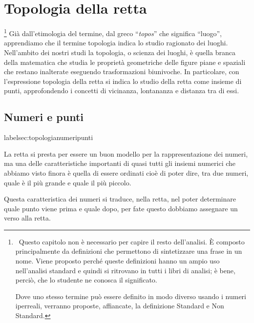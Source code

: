 


\chapter{Topologia della retta}

\footnote{~Questo capitolo non è necessario per capire il resto 
dell'analisi.
È composto principalmente da definizioni che permettono di sintetizzare una 
frase in un nome.
Viene proposto perché queste definizioni hanno un ampio uso nell'analisi 
standard e quindi si ritrovano in tutti i libri di analisi; 
è bene, perciò, che lo studente ne conosca il significato.

Dove uno stesso termine può essere definito in modo diverso 
usando i numeri iperreali, verranno proposte, affiancate, la definizione 
Standard e Non Standard.}
Già dall'etimologia del termine, dal greco ``\emph{topos}'' che significa 
``luogo'', apprendiamo che il termine topologia indica lo studio 
ragionato dei luoghi. 
Nell'ambito dei nostri studi la topologia, o scienza dei luoghi, 
è quella branca della matematica che studia le proprietà geometriche 
delle figure piane e spaziali che restano inalterate eseguendo 
trasformazioni biunivoche. 
In particolare, con l'espressione topologia della retta si indica 
lo studio della retta come insieme di punti, approfondendo i concetti di 
vicinanza, lontananza e distanza tra di essi.

\section{Numeri e punti}
label{sec:topologianumeripunti}

La retta si presta per essere un buon modello per la rappresentazione dei 
numeri, ma una delle caratteristiche importanti di quasi tutti gli insiemi 
numerici che abbiamo visto finora è quella di essere ordinati cioè di poter 
dire, tra due numeri, quale è il più grande e quale il più piccolo.

Questa caratteristica dei numeri si traduce, nella retta, nel poter 
determinare quale punto viene prima e quale dopo, 
per fate questo dobbiamo assegnare un verso alla retta.


